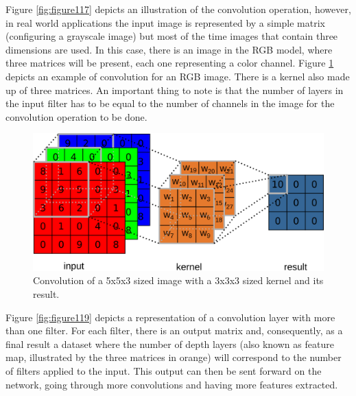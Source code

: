 Figure \ref{fig:figure117} depicts an illustration of the convolution operation, however, in real world applications the input image is represented by a simple matrix (configuring a grayscale image) but most of the time images that contain three dimensions are used. In this case, there is an image in the RGB model, where three matrices will be present, each one representing a color channel. Figure \ref{fig:figure118} depicts an example of convolution for an RGB image. There is a kernel also made up of three matrices. An important thing to note is that the number of layers in the input filter has to be equal to the number of channels in the image for the convolution operation to be done.

\begin{figure}
    \centering
    \includegraphics[scale=0.35]{"Part 3 - Learning Systems/Supervised Learning/Deep Learning/images/figure118.png"}
    \caption{Convolution of a 5x5x3 sized image with a 3x3x3 sized kernel and its result.} 
    \label{fig:figure118}
\end{figure}

Figure \ref{fig:figure119} depicts a representation of a convolution layer with more than one filter. For each filter, there is an output matrix and, consequently, as a final result a dataset where the number of depth layers (also known as feature map, illustrated by the three matrices in orange) will correspond to the number of filters applied to the input. This output can then be sent forward on the network, going through more convolutions and having more features extracted.

